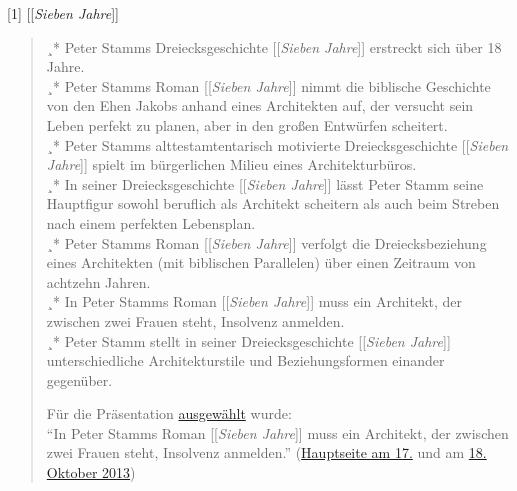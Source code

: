 \documentclass[fontsize=12pt]{scrartcl}
\begin{document}
[1] [[\textit{Sieben Jahre}]]
\singlespacing
\begin{quote}
¸* Peter Stamms Dreiecksgeschichte [[\textit{Sieben Jahre}]] erstreckt sich \"uber 18 Jahre.\\
¸* Peter Stamms Roman [[\textit{Sieben Jahre}]] nimmt die biblische Geschichte von den Ehen Jakobs anhand eines Architekten auf, der versucht sein Leben perfekt zu planen, aber in den gro{\ss}en Entw\"urfen scheitert.\\
¸* Peter Stamms alttestamtentarisch moti\-vier\-te Dreiecksgeschichte [[\textit{Sie\-ben Jahre}]] spielt im b\"urgerlichen Milieu eines Architekturb\"uros.\\
¸* In seiner Dreiecksgeschichte [[\textit{Sieben Jahre}]] l\"asst Peter Stamm seine Hauptfigur sowohl beruflich als Architekt scheitern als auch beim Streben nach einem perfekten Lebensplan.\\
¸* Peter Stamms Roman [[\textit{Sieben Jahre}]] verfolgt die Dreiecksbeziehung eines Architekten (mit biblischen Parallelen) \"uber einen Zeitraum von achtzehn Jahren.\\
¸* In Peter Stamms Roman [[\textit{Sieben Jahre}]] muss ein Architekt, der zwi\-schen zwei Frauen steht, Insolvenz anmelden.\\
¸* Peter Stamm stellt in seiner Dreiecksgeschichte [[\textit{Sieben Jahre}]] unterschiedliche Architekturstile und Beziehungsformen einander gegen\"uber.

F\"ur die Pr\"asentation \href{https://de.wikipedia.org/wiki/Wikipedia_Diskussion:Hauptseite/Schon_gewusst/Diskussionsarchiv/2013/Oktober#Eigenvorschlag:_Sieben_Jahre_.28Peter_Stamm.29_.282._Okt..29_.28erl..29}{ausgew\"ahlt} wurde:\\ 
"`In Peter Stamms Roman [[\textit{Sieben Jahre}]] muss ein Architekt, der zwi\-schen zwei Frauen steht, Insolvenz anmelden."' (\href{https://de.wikipedia.org/wiki/Wikipedia:Hauptseite/Archiv/17._Oktober_2013}{Hauptseite am 17.} und am \href{https://de.wikipedia.org/wiki/Wikipedia:Hauptseite/Archiv/18._Oktober_2013}{18. Oktober 2013})
\end{quote}
\onehalfspacing
\end{document}
